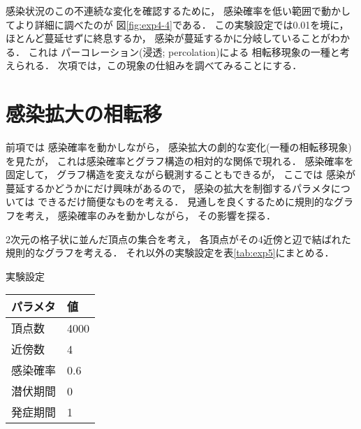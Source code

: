 \documentclass[10pt,oneside,fleqn]{scrartcl}
\begin{document}
\begin{figure*}%
  \centering
\end{figure*}

感染状況のこの不連続な変化を確認するために，
感染確率を低い範囲で動かしてより詳細に調べたのが
図\ref{fig:exp4-4}である．
この実験設定では0.01を境に，
ほとんど蔓延せずに終息するか，
感染が蔓延するかに分岐していることがわかる．
これは
パーコレーション(浸透; percolation)による
相転移現象の一種と考えられる．
次項では，この現象の仕組みを調べてみることにする．

\section{感染拡大の相転移}
\label{sec:org6de58c8}

前項では
感染確率を動かしながら，
感染拡大の劇的な変化(一種の相転移現象)を見たが，
これは感染確率とグラフ構造の相対的な関係で現れる．
感染確率を固定して，
グラフ構造を変えながら観測することもできるが，
ここでは
感染が蔓延するかどうかにだけ興味があるので，
感染の拡大を制御するパラメタについては
できるだけ簡便なものを考える．
見通しを良くするために規則的なグラフを考え，
感染確率のみを動かしながら，
その影響を探る．

2次元の格子状に並んだ頂点の集合を考え，
各頂点がその4近傍と辺で結ばれた規則的なグラフを考える．
それ以外の実験設定を表\ref{tab:exp5}にまとめる．

\begin{margintable}
  \caption{実験設定}
  \label{tab:exp5}
  \small
  \begin{tabular}{ll}
    \toprule
    パラメタ&値 \\
    \midrule
    頂点数&4000 \\
    近傍数&4 \\
    感染確率&0.6 \\
    潜伏期間&0 \\
    発症期間&1 \\
    \bottomrule
  \end{tabular}
\end{margintable}

\begin{figure}[htbp]
  \centering
  \setcounter{GraphPage}{15}
  \setcounter{GraphPage}{30}
  \setcounter{GraphPage}{45}
  \setcounter{GraphPage}{60}
\end{figure}
\end{document}
